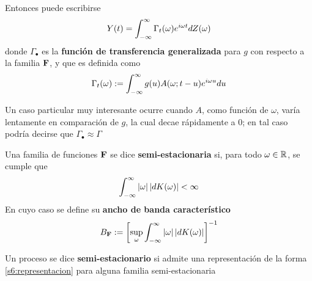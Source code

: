 Entonces puede escribirse 
\begin{equation}
Y(t) = \int_{-\infty}^{\infty} \Gamma_t(\omega) e^{i \omega t} dZ(\omega) 
\label{se6:filtrado}
\end{equation}
donde $\Gamma_\bullet$ es la \textbf{función de transferencia generalizada} para $g$ con respecto a la familia $\mathbf{F}$, y que es definida como
\begin{equation}
\Gamma_t (\omega) := \int_{-\infty}^{\infty} g(u) A(\omega; t-u) e^{i \omega u} du
\label{se6:trans_general}
\end{equation}


Un caso particular muy interesante ocurre cuando $A$, como función de $\omega$, varía lentamente en comparación de $g$, la cual decae rápidamente a 0; en tal caso podría decirse que $\Gamma_\bullet \approx \Gamma$


\begin{definicion}
Una familia de funciones $\mathbf{F}$ se dice \textbf{semi-estacionaria} si, para todo $\omega \in \mathbb{R}$, se cumple que
\begin{equation}
\int_{-\infty}^{\infty} \left| \omega \right| \left| dK(\omega) \right| < \infty
\end{equation}
En cuyo caso se define su \textbf{ancho de banda característico}
\begin{equation}
B_{\mathbf{F}} := \left[ \sup_\omega \int_{-\infty}^{\infty} \left| \omega \right| \left| dK(\omega) \right| \right]^{-1}
\end{equation}
\end{definicion}

\begin{definicion}
Un proceso \xt se dice \textbf{semi-estacionario} si admite una representación de la forma \ref{s6:representacion} para alguna familia semi-estacionaria
\end{definicion}


